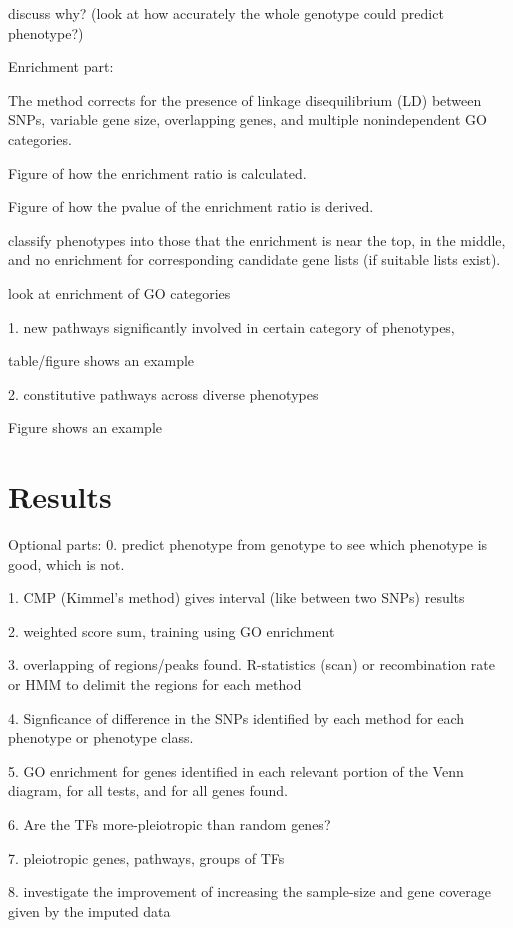 \documentclass[10pt]{article}
\begin{document}
discuss why? (look at how accurately the whole genotype could predict phenotype?)


Enrichment part:

The method corrects for the presence of linkage disequilibrium (LD) between SNPs, variable gene size, overlapping genes, and multiple nonindependent GO categories.

	Figure of how the enrichment ratio is calculated.

	Figure of how the pvalue of the enrichment ratio is derived.

classify phenotypes into those that the enrichment is near the top, in the middle, and no enrichment for corresponding candidate gene lists (if suitable lists exist).

look at enrichment of GO categories

1. new pathways significantly involved in certain category of phenotypes,

	table/figure shows an example

2. constitutive pathways across diverse phenotypes

	Figure shows an example



\section*{Results}



Optional parts:
0. predict phenotype from genotype to see which phenotype is good, which is not.

1. CMP (Kimmel's method) gives interval (like between two SNPs) results

2. weighted score sum, training using GO enrichment

3. overlapping of regions/peaks found. R-statistics (scan) or recombination rate or HMM to delimit the regions for each method

4. Signficance of difference in the SNPs identified by each method for each phenotype or phenotype class.

5. GO enrichment for genes identified in each relevant portion of the Venn diagram, for all tests, and for all genes found.

6. Are the TFs more-pleiotropic than random genes?

7. pleiotropic genes, pathways, groups of TFs

8. investigate the improvement of increasing the sample-size and gene coverage given by the imputed data
\end{document}

